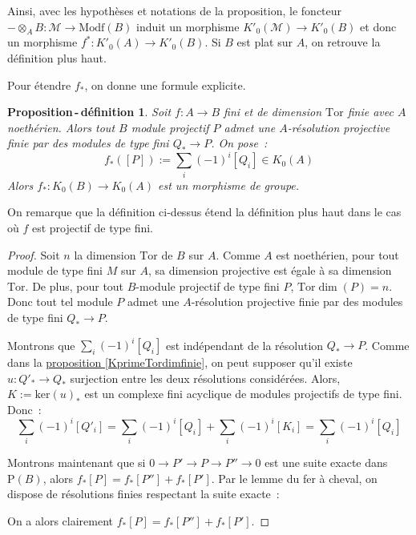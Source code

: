 \documentclass{amsart}
\newcommand{\sref}[2]{\hyperref[#2]{#1 \ref*{#2}}}
\theoremstyle{plain}
\newtheorem{propdefi}[theo]{Proposition\,-\,définition}
\theoremstyle{definition}
\theoremstyle{remark}
\newcommand{\Proj}[1]{\mathrm{P}({#1})}
\newcommand{\Modf}[1]{\mathrm{Modf}({#1})}
\newcommand{\Tor}{\mathrm{Tor}}
\newcommand{\ra}{\rightarrow}
\newcommand{\exa}[3]{0\ra {#1}\ra {#2}\ra {#3}\ra 0}
\newcommand{\myker}[1]{\mathrm{ker}({#1})}
\begin{document}
Ainsi, avec les hypothèses et notations de la proposition, le foncteur $-\otimes_A B:\mathcal{M}\ra \Modf{B}$ induit un morphisme $K'_0(\mathcal{M})\ra K'_0(B)$
et donc un morphisme $f^*:K'_0(A)\ra K'_0(B)$. Si $B$ est plat sur $A$, on retrouve la définition plus haut.

Pour étendre $f_*$, on donne une formule explicite.

\begin{propdefi}
  Soit $f:A\ra B$ fini et de dimension $\Tor$ finie avec $A$ noethérien. Alors tout $B$ module projectif $P$ admet
  une $A$-résolution projective finie par des modules de type fini $Q_*\ra P$. On pose~:
  $$f_*([P]) := \sum_{i} (-1)^i[Q_i]\in K_0(A)$$
  Alors $f_*:K_0(B)\ra K_0(A)$ est un morphisme de groupe.
\end{propdefi}

On remarque que la définition ci-dessus étend la définition plus haut dans le cas où $f$ est projectif de type fini.

\begin{proof}
  Soit $n$ la dimension $\Tor$ de $B$ sur $A$. Comme $A$ est noethérien, pour tout module de type fini $M$ sur $A$, sa dimension projective
  est égale à sa dimension $\Tor$. De plus, pour tout $B$-module projectif de type fini $P$, $\Tor\dim(P)=n$. Donc tout tel module $P$ admet une
  $A$-résolution projective finie par des modules de type fini $Q_*\ra P$. 

  Montrons que $\sum_{i} (-1)^i[Q_i]$ est indépendant de la résolution $Q_*\ra P$. Comme dans la \sref{proposition}{KprimeTordimfinie}, on peut
  supposer qu'il existe $u:Q'_*\ra Q_*$ surjection entre les deux résolutions considérées. Alors,
  $K:=\myker{u}_*$ est un complexe fini acyclique de modules projectifs de type fini. Donc~:
  $$\sum_{i} (-1)^i[Q'_i]=\sum_{i} (-1)^i[Q_i]+\sum_{i} (-1)^i[K_i]=\sum_{i} (-1)^i[Q_i]$$

  Montrons maintenant que si $\exa{P'}{P}{P''}$ est une suite exacte dans $\Proj{B}$, alors $f_*[P] = f_*[P'']+f_*[P']$.
  Par le lemme du fer à cheval, on dispose de résolutions finies respectant la suite exacte~:
  \begin{center}
  \end{center}
  On a alors clairement $f_*[P] = f_*[P'']+f_*[P']$.  
\end{proof}
\end{document}
